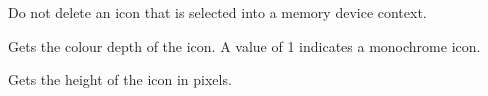 Do not delete an icon that is selected into a memory device context.

\begin{comment}
\membersection{wxIcon::Create}\label{wxiconcreate}

\func{virtual bool}{Create}{\param{const int}{ width}, \param{const int}{ height}, \param{const int}{ depth = -1}}

Creates a fresh icon. If the final argument is omitted, the display depth of
the screen is used.

\func{virtual bool}{Create}{\param{void*}{ data}, \param{const int}{ type}, \param{const int}{ width}, \param{const int}{ height}, \param{const int}{ depth = -1}}

Creates an icon from the given data, which can be of arbitrary type.

\wxheading{Parameters}

\docparam{width}{The width of the icon in pixels.}

\docparam{height}{The height of the icon in pixels.}

\docparam{depth}{The depth of the icon in pixels. If this is -1, the screen depth is used.}

\docparam{data}{Data whose type depends on the value of {\it type}.}

\docparam{type}{An icon type identifier - see \helpref{wxIcon::wxIcon}{wxiconconstr} for a list
of possible values.}

\wxheading{Return value}

TRUE if the call succeeded, FALSE otherwise.

\wxheading{Remarks}

The first form works on all platforms. The portability of the second form depends on the
type of data.

\wxheading{See also}

\helpref{wxIcon::wxIcon}{wxiconconstr}

\end{comment}



Gets the colour depth of the icon. A value of 1 indicates a
monochrome icon.

\label{wxicongetheight}


Gets the height of the icon in pixels.

